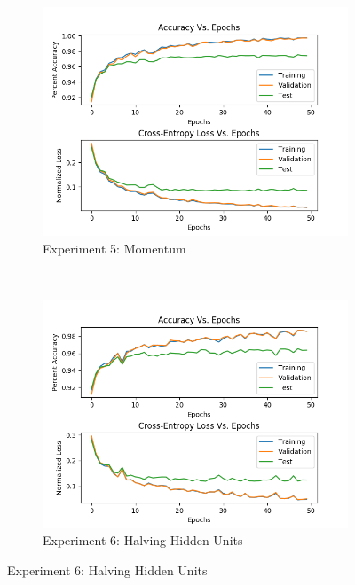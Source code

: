 \documentclass{article} %
\begin{document}
{{\begin{figure}[h!]
\captionsetup[subfigure]{labelformat=empty}
    \centering
    \begin{subfigure}[t]{0.5\textwidth}
        \centering
        \includegraphics[scale=0.48]{4D.png}
        \caption{Experiment 5: Momentum}
    \end{subfigure}%
    ~ 
    \begin{subfigure}[t]{0.5\textwidth}
        \centering
        \includegraphics[scale=0.48]{5A_1.png}
        \caption{Experiment 6: Halving Hidden Units}
    \end{subfigure}
\end{figure}

}}
\end{document}
